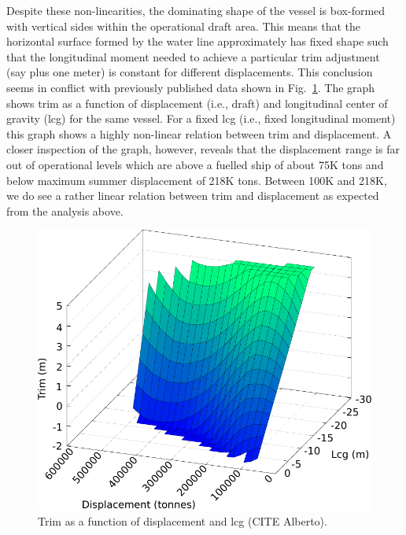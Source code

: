 \documentclass[runningheads]{llncs}
\begin{document}
Despite these non-linearities, the dominating shape of the vessel is box-formed with vertical sides within the operational draft area. This means that the horizontal surface formed by the water line approximately has fixed shape such that the longitudinal moment needed to achieve a particular trim adjustment (say plus one meter) is constant for different displacements. This conclusion seems in conflict with previously published data shown in Fig.~\ref{fig:hdtrim}. The graph shows trim as a function of displacement (i.e., draft) and longitudinal center of gravity (lcg) for the same vessel. For a fixed lcg (i.e., fixed longitudinal moment) this graph shows a highly non-linear relation between trim and displacement. A closer inspection of the graph, however, reveals that the displacement range is far out of operational levels which are above a fuelled ship of about 75K tons and below maximum summer displacement of 218K tons. Between 100K and 218K, we do see a rather linear relation between trim and displacement as expected from the analysis above.  

\begin{figure}[h!]
\begin{center}
  \includegraphics[scale=0.5]{figures/hd_trim}
\end{center}
\caption{Trim as a function of displacement and lcg (CITE Alberto).}
\label{fig:hdtrim}
\end{figure}
\end{document}
